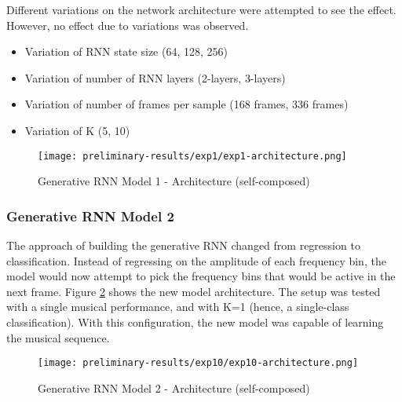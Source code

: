 \documentclass[../main.tex]{subfiles}
\begin{document}
\iffalse
 Figure \ref{fig:exp1-performance} shows the model loss when trained for 500 epochs.
\fi
 

\par
Different variations on the network architecture were attempted to see the effect. However, no effect due to variations was observed.
\begin{itemize}
    \item Variation of RNN state size (64, 128, 256)
    \item Variation of number of RNN layers (2-layers, 3-layers)
    \item Variation of number of frames per sample (168 frames, 336 frames)
    \item Variation of K (5, 10)
\end{itemize}



\begin{figure}[H]
    \centering
    \texttt{[image: preliminary-results/exp1/exp1-architecture.png]}
    \caption{Generative RNN Model 1 - Architecture (self-composed)}
    \label{fig:exp1-architecture}
\end{figure}


\iffalse
\begin{figure}[H]
    \centering
    \texttt{[image: preliminary-results/exp1/exp1-performance.png]}
    \caption{Generative RNN Model 1 - Performance}
    \label{fig:exp1-performance}
\end{figure}
\fi

\subsubsection{Generative RNN Model 2}

\par
The approach of building the generative RNN changed from regression to classification. Instead of regressing on the amplitude of each frequency bin, the model would now attempt to pick the frequency bins that would be active in the next frame. Figure \ref{fig:exp10-architecture} shows the new model architecture. The setup was tested with a single musical performance, and with K=1 (hence, a single-class classification). With this configuration, the new model was capable of learning the musical sequence. 
\iffalse
Figure \ref{fig:exp10-performance} shows the model loss when trained for 500 epochs.
\fi

\begin{figure}[H]
    \centering
    \texttt{[image: preliminary-results/exp10/exp10-architecture.png]}
    \caption{Generative RNN Model 2 - Architecture (self-composed)}
    \label{fig:exp10-architecture}
\end{figure}
\end{document}
